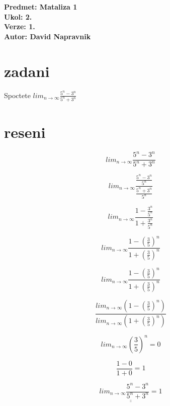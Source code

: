 \documentclass[a4paper]{article}
\def\doubleunderline#1{\underline{\underline{#1}}}
\begin{document}
\noindent
\textbf{Predmet: Mataliza 1}\\
\textbf{Ukol: 2.}\\
\textbf{Verze: 1.}\\
\textbf{Autor: David Napravnik}

\section*{zadani}
Spoctete $lim_{n\rightarrow \infty}\frac{5^n - 3^n}{5^n + 3^n}$

\section*{reseni}
$$
	lim_{n\rightarrow \infty}
	\frac{5^n - 3^n}{5^n + 3^n}
$$

$$
	lim_{n\rightarrow \infty}
	\frac{\frac{5^n - 3^n}{5^n}}{\frac{5^n + 3^n}{5^n}}
$$

$$
	lim_{n\rightarrow \infty}
	\frac{1 - \frac{3^n}{5^n}}{1 + \frac{3^n}{5^n}}
$$

$$
	lim_{n\rightarrow \infty}
	\frac{1 - (\frac{3}{5})^n}{1 + (\frac{3}{5})^n}
$$

$$
	lim_{n\rightarrow \infty}
	\frac{1 - (\frac{3}{5})^n}{1 + (\frac{3}{5})^n}
$$

$$
	\frac
		{lim_{n\rightarrow \infty} (1 - (\frac{3}{5})^n)}
		{lim_{n\rightarrow \infty} (1 + (\frac{3}{5})^n)}
$$

$$
	lim_{n\rightarrow \infty} \left(\frac{3}{5}\right)^n = 0
$$

$$
	\frac{1-0}{1+0} = 1
$$

$$
	\doubleunderline{
		lim_{n\rightarrow \infty}
		\frac{5^n - 3^n}{5^n + 3^n} = 1
	}
$$
\end{document}
